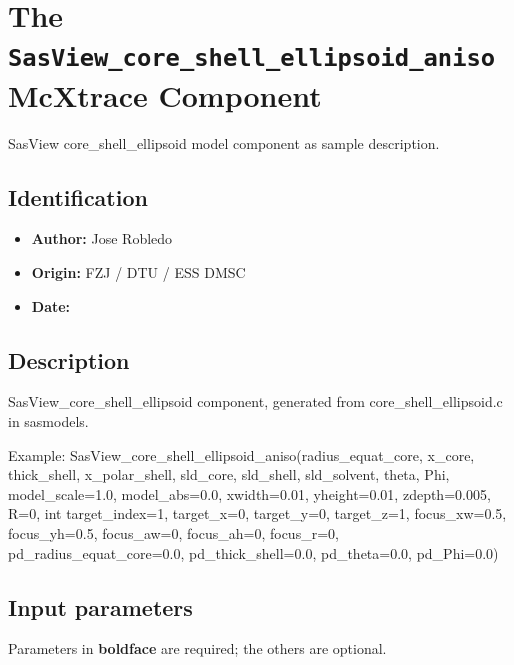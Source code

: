 \section{The \texttt{SasView\_core\_shell\_ellipsoid\_aniso} McXtrace Component}
SasView core\_shell\_ellipsoid model component as sample description.

\subsection*{Identification}
\begin{itemize}
  \item \textbf{Author:} Jose Robledo
  \item \textbf{Origin:} FZJ / DTU / ESS DMSC
  \item \textbf{Date:} 
\end{itemize}

\subsection*{Description}
SasView\_core\_shell\_ellipsoid component, generated from core\_shell\_ellipsoid.c in sasmodels.

Example: SasView\_core\_shell\_ellipsoid\_aniso(radius\_equat\_core, x\_core, thick\_shell, x\_polar\_shell, sld\_core, sld\_shell, sld\_solvent, theta, Phi, model\_scale=1.0, model\_abs=0.0, xwidth=0.01, yheight=0.01, zdepth=0.005, R=0, int target\_index=1, target\_x=0, target\_y=0, target\_z=1, focus\_xw=0.5, focus\_yh=0.5, focus\_aw=0, focus\_ah=0, focus\_r=0, pd\_radius\_equat\_core=0.0, pd\_thick\_shell=0.0, pd\_theta=0.0, pd\_Phi=0.0)

\subsection*{Input parameters}
Parameters in \textbf{boldface} are required; the others are optional.

